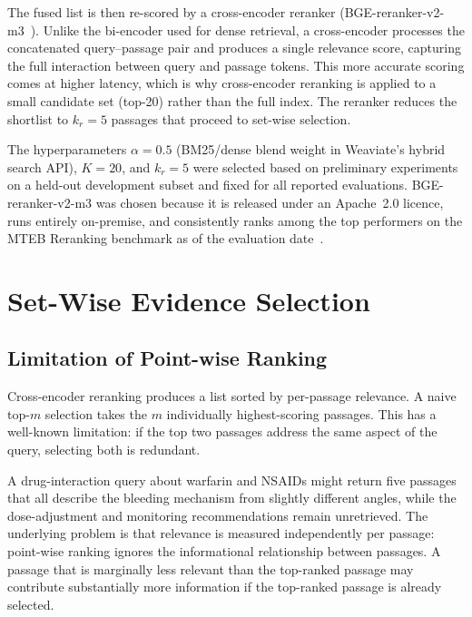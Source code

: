 The fused list is then re-scored by a cross-encoder reranker
(BGE-reranker-v2-m3~\cite{chen2024bge}).
Unlike the bi-encoder used for dense retrieval, a cross-encoder processes
the concatenated query--passage pair and produces a single relevance score,
capturing the full interaction between query and passage tokens.
This more accurate scoring comes at higher latency, which is why cross-encoder
reranking is applied to a small candidate set (top-20) rather than the full index.
The reranker reduces the shortlist to $k_r = 5$ passages that proceed to
set-wise selection.

The hyperparameters $\alpha = 0.5$ (BM25/dense blend weight in Weaviate's
hybrid search API), $K = 20$, and $k_r = 5$ were selected based on
preliminary experiments on a held-out development subset and fixed for
all reported evaluations.
BGE-reranker-v2-m3 was chosen because it is released under an Apache~2.0
licence, runs entirely on-premise, and consistently ranks among the
top performers on the MTEB Reranking benchmark as of the evaluation
date~\cite{chen2024bge}.

\section{Set-Wise Evidence Selection}
\label{sec:setwise}

\subsection{Limitation of Point-wise Ranking}

Cross-encoder reranking produces a list sorted by per-passage relevance.
A naive top-$m$ selection takes the $m$ individually highest-scoring passages.
This has a well-known limitation: if the top two passages address the same aspect
of the query, selecting both is redundant.

A drug-interaction query about warfarin and NSAIDs might return five passages
that all describe the bleeding mechanism from slightly different angles, while
the dose-adjustment and monitoring recommendations remain unretrieved.
The underlying problem is that relevance is measured independently per passage:
point-wise ranking ignores the informational relationship between passages.
A passage that is marginally less relevant than the top-ranked passage may
contribute substantially more information if the top-ranked passage is already
selected.

